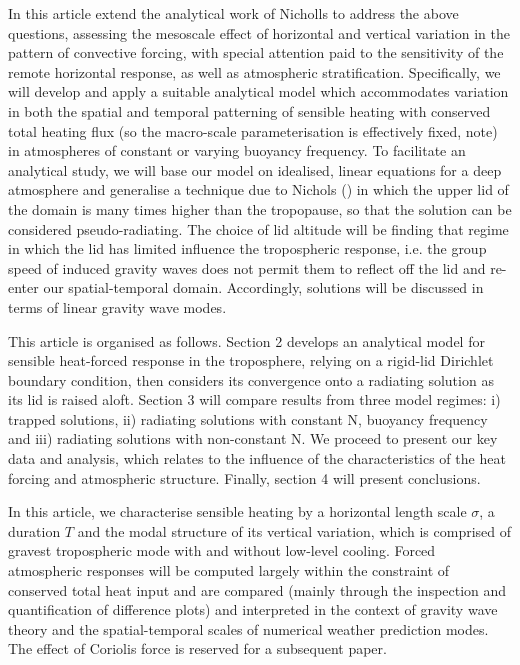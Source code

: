 \documentclass[a4paper,10pt]{article}
\begin{document}
In this article extend the analytical work of Nicholls to address the above questions, assessing the mesoscale effect of horizontal and vertical variation in the pattern of convective forcing, with special attention 
paid to the sensitivity of the remote horizontal response, as well as atmospheric stratification. Specifically, we will develop and apply a suitable analytical model which accommodates variation in both the spatial 
and temporal patterning of sensible heating with conserved total heating flux (so the macro-scale parameterisation is effectively fixed, note) in atmospheres of constant or varying buoyancy frequency. To 
facilitate an analytical study, we will base our model on idealised, linear equations for a deep atmosphere and generalise a technique due to Nichols  (\citeyear{nicholls1991thermally}) in which the upper lid of 
the domain is many times higher than the tropopause, so that the solution can be considered pseudo-radiating. The choice of lid altitude will be finding that regime in which the lid has limited influence the 
tropospheric response, i.e. the group speed of induced gravity waves does not permit them to reflect off the lid and re-enter our spatial-temporal domain. 
Accordingly, solutions will be discussed in terms of linear gravity wave modes.   

This article is organised as follows. Section 2 develops an analytical model for sensible heat-forced response in the troposphere, relying on a rigid-lid Dirichlet boundary condition, then considers its convergence 
onto a radiating solution as its lid is raised aloft. Section 3 will compare results from three model regimes: i) trapped solutions, ii) radiating solutions with constant N, buoyancy frequency and iii) radiating 
solutions with non-constant N. We proceed to present our key data and analysis, which relates to the influence of the characteristics of the heat forcing and atmospheric structure. Finally, section 4 will present 
conclusions.

In this article, we characterise sensible heating by a horizontal length scale $\sigma$, a duration $T$ and the modal structure of its vertical variation, which is comprised of gravest tropospheric mode with and without low-level cooling. Forced atmospheric 
responses will be computed largely within the constraint of conserved total heat input and are compared (mainly through the inspection and quantification of difference plots) and interpreted in the context of gravity wave theory and the spatial-temporal scales of 
numerical weather prediction modes. The effect of Coriolis force is reserved for a subsequent paper. 
%
%
%
\end{document}
